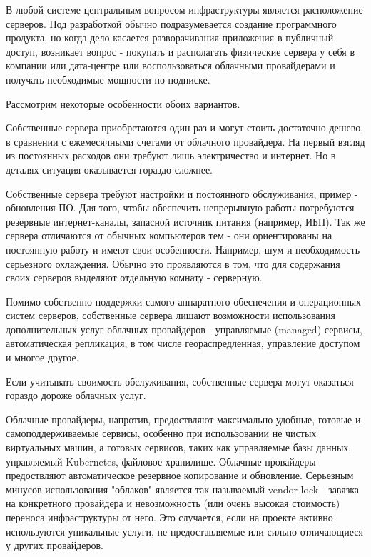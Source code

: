 В любой системе центральным вопросом инфраструктуры является расположение серверов. Под разработкой обычно подразумевается создание программного продукта, но когда дело касается разворачивания приложения в публичный доступ, возникает вопрос - покупать и располагать физические сервера у себя в компании или дата-центре или воспользоваться облачными провайдерами и получать необходимые мощности по подписке.

Рассмотрим некоторые особенности обоих вариантов.

Собственные сервера приобретаются один раз и могут стоить достаточно дешево, в сравнении с ежемесячными счетами от облачного провайдера. На первый взгляд из постоянных расходов они требуют лишь электричество и интернет. Но в деталях ситуация оказывается гораздо сложнее.

Собственные сервера требуют настройки и постоянного обслуживания, пример - обновления ПО. Для того, чтобы обеспечить непрерывную работы потребуются резервные интернет-каналы, запасной источник питания (например, ИБП).
Так же сервера отличаются от обычных компьютеров тем - они ориентированы на постоянную работу и имеют свои особенности. Например, шум и необходимость серьезного охлаждения. Обычно это проявляются в том, что для содержания своих серверов выделяют отдельную комнату - серверную.

Помимо собственно поддержки самого аппаратного обеспечения и операционных систем серверов, собственные сервера лишают возможности использования дополнительных услуг облачных провайдеров - управляемые (managed) сервисы, автоматическая репликация, в том числе геораспредленная, управление доступом и многое другое.

Если учитывать своимость обслуживания, собственные сервера могут оказаться гораздо дороже облачных услуг.

Облачные провайдеры, напротив, предоствляют максимально удобные, готовые и самоподдерживаемые сервисы, особенно при использовании не чистых виртуальных машин, а готовых сервисов, таких как управляемые базы данных, управляемый Kubernetes, файловое хранилище. Облачные провайдеры предоствляют автоматическое резервное копирование и обновление. Серьезным минусов использования "облаков" является так называемый vendor-lock - завязка на конкретного провайдера и невозможность (или очень высокая стоимость) переноса инфраструктуры от него. Это случается, если на проекте активно используются уникальные услуги, не предоставляемые или сильно отличающиеся у других провайдеров.

